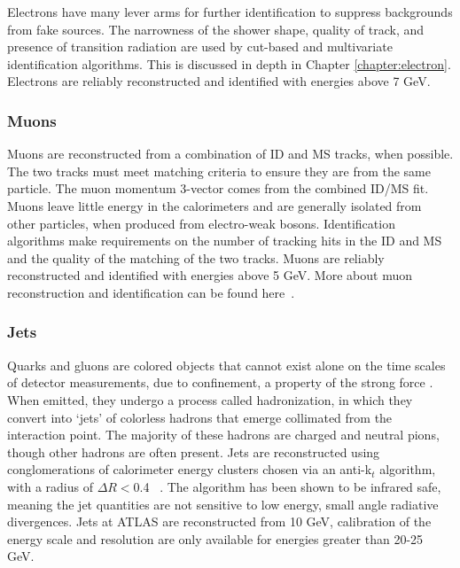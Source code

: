 Electrons have many lever arms for further identification to suppress backgrounds from fake sources. The narrowness of the shower shape, quality of track, and presence of transition radiation are used by cut-based and multivariate identification algorithms. This is discussed in depth in Chapter \ref{chapter:electron}. Electrons are reliably reconstructed and identified with energies above 7 GeV. 

\subsubsection{Muons}

Muons are reconstructed from a combination of ID and MS tracks, when possible. The two tracks must meet matching criteria to ensure they are from the same particle. The muon momentum 3-vector comes from the combined ID/MS fit. Muons leave little energy in the calorimeters and are generally isolated from other particles, when produced from electro-weak bosons. Identification algorithms make requirements on the number of tracking hits in the ID and MS and the quality of the matching of the two tracks. Muons are reliably reconstructed and identified with energies above 5 GeV. More about muon reconstruction and identification can be found here~\cite{MCP2012}.


\subsubsection{Jets}

Quarks and gluons are colored objects that cannot exist alone on the time scales of detector measurements, due to confinement, a property of the strong force . When emitted, they undergo a process called hadronization, in which they convert into `jets' of colorless hadrons that emerge collimated from the interaction point. The majority of these hadrons are charged and neutral pions, though other hadrons are often present. Jets are reconstructed using conglomerations of calorimeter energy clusters chosen via an anti-k$_t$ algorithm, with a radius of $\Delta R <$0.4 ~\cite{Cacciari:2008gp}. The algorithm has been shown to be infrared safe, meaning the jet quantities are not sensitive to low energy, small angle radiative divergences. Jets at ATLAS are reconstructed from 10 GeV, calibration of the energy scale and resolution are only available for energies greater than 20-25 GeV. 

